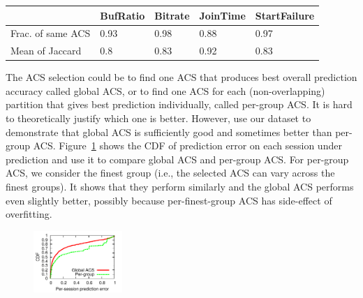 

\begin{table}[t]
\begin{center}
\begin{small}
\begin{tabular}{p{2.2cm}|p{1.1cm}|p{1.1cm}|p{1.1cm}|p{1.1cm}}
		& BufRatio & Bitrate & JoinTime & StartFailure\\ \hline 
Frac. of same ACS & 0.93 & 0.98 & 0.88 & 0.97 \\
Mean of Jaccard & 0.8 & 0.83 & 0.92 & 0.83 \\
\end{tabular}
\end{small}
\end{center}
\label{tab:greedy-exhaustive}
\end{table}

 The ACS selection could be to find one ACS that produces best overall prediction accuracy called global ACS, or to find one ACS for each (non-overlapping) partition that gives best prediction individually, called per-group ACS. It is hard to theoretically justify which one is better. However, use our dataset to demonstrate that global ACS is sufficiently good and sometimes better than per-group ACS.
Figure~\ref{fig:global-acs} shows the CDF of prediction error on each session under prediction and use it to compare global ACS and per-group ACS. For per-group ACS, we consider the finest group (i.e., the selected ACS can vary across the finest groups). It shows that they perform similarly and the global ACS performs even slightly better, possibly because per-finest-group ACS has side-effect of overfitting.

\begin{figure}[h!]
\centering
 \includegraphics[width=0.3\textwidth] {figures/newfig/example-granular-metric0-new.pdf}
\label{fig:global-acs}
\end{figure}


